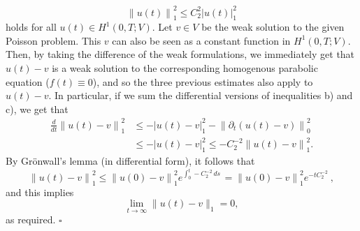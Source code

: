 \documentclass[a4paper]{article}
\newcommand{\ds}{\, ds \,}
\newcommand{\seminorm}[1]{\left\lvert #1 \right\rvert}
\newcommand{\norm}[1]{\left\lVert #1 \right\rVert}
\begin{document}
\begin{enumerate}[label=\textbf{\alph*)},leftmargin=*]
	\[
	\norm{u(t)}_1^2 \leq C_2^2 \seminorm{u(t)}_1^2
	\]
	holds for all $u(t) \in H^1(0,T;V)$.
	Let $v \in V$ be the weak solution to the given Poisson problem.
	This $v$ can also be seen as a constant function in $H^1(0,T;V)$.
	Then, by taking the difference of the weak formulations,
	we immediately get that $u(t)-v$ is a weak solution to the
	corresponding homogenous parabolic equation ($f(t) \equiv 0$),
	and so the three previous estimates also apply to $u(t)-v$.
	In particular, if we sum the differential versions of inequalities b) and c),
	we get that
	\begin{align*}
	\frac{d}{dt} \norm{u(t)-v}_1^2
&	\leq -\seminorm{u(t)-v}_1^2 - \norm{\partial_t(u(t)-v)}_0^2 \\
&	\leq -\seminorm{u(t)-v}_1^2
	\leq -C_2^{-2} \norm{u(t)-v}_1^2.
	\end{align*}
	By Grönwall's lemma (in differential form), it follows that
	\[
	\norm{u(t)-v}_1^2
	\leq \norm{u(0)-v}_1^2 e^{\int_0^t -C_2^{-2} \ds}
	= \norm{u(0)-v}_1^2 e^{-tC_2^{-2}} \ ,
	\]
	and this implies
	\[
	\lim_{t\to\infty}\|u(t)-v\|_1 = 0,
	\]
	as required. $\square$
\end{enumerate}
\end{document}
